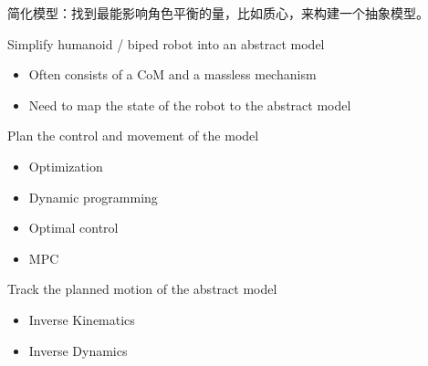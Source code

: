 \documentclass[lang=cn,newtx,10pt,scheme=chinese]{elegantbook}
\begin{document}
简化模型：找到最能影响角色平衡的量，比如质心，来构建一个抽象模型。

Simplify humanoid / biped robot into an abstract model
\begin{itemize}[itemindent=2em]
  \item Often consists of a CoM and a massless mechanism
  \item Need to map the state of the robot to the abstract model
\end{itemize}

Plan the control and movement of the model
\begin{itemize}[itemindent=2em]
  \item Optimization
  \item Dynamic programming
  \item Optimal control
  \item MPC
\end{itemize}

Track the planned motion of the abstract model
\begin{itemize}[itemindent=2em]
  \item Inverse Kinematics
  \item Inverse Dynamics
\end{itemize}
\end{document}
